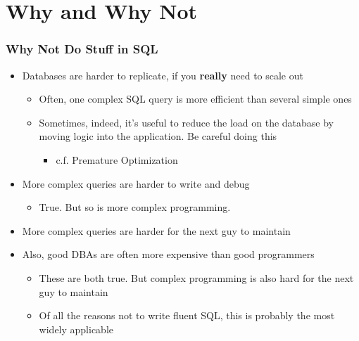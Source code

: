 \documentclass{beamer}
\begin{document}
\section{Why and Why Not}
\begin{frame}
    \frametitle{Why Not Do Stuff in SQL}
    \begin{itemize}
        \item Databases are harder to replicate, if you \textbf{really} need to scale out
        \pause
        \begin{itemize}
            \item Often, one complex SQL query is more efficient than several simple ones
            \pause
            \item Sometimes, indeed, it's useful to reduce the load on the database by moving logic into the application. Be careful doing this
            \pause
            \begin{itemize}
                \item c.f. Premature Optimization
                \pause
            \end{itemize}
        \end{itemize}
        \item More complex queries are harder to write and debug
        \pause
        \begin{itemize}
            \item True. But so is more complex programming.
            \pause
        \end{itemize}
        \item More complex queries are harder for the next guy to maintain
        \pause
        \item Also, good DBAs are often more expensive than good programmers
        \pause
        \begin{itemize}
            \item These are both true. But complex programming is also hard for the next guy to maintain
            \pause
            \item Of all the reasons not to write fluent SQL, this is probably the most widely applicable
        \end{itemize}
    \end{itemize}
\end{frame}
\end{document}
